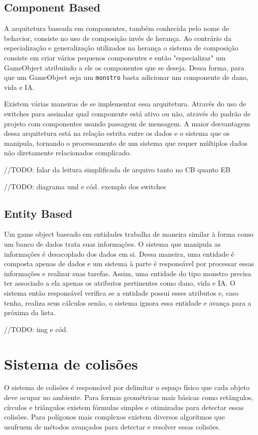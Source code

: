 \documentclass[12pt, 
openright, 
oneside, 
a4paper,    
brazil]{facom-ufu-abntex2}
\begin{document}
\subsection{Component Based}
A arquitetura baseada em componentes, também conhecida pelo nome de behavior, consiste no uso de composição invés de herança. Ao contrário da especialização e generalização utilizados na herança o sistema de composição consiste em criar vários pequenos componentes e então "especializar" um GameObject atribuindo a ele os componentes que se deseja. Dessa forma, para que um GameObject seja um \texttt{monstro} basta adicionar um componente de dano, vida e IA.

Existem várias maneiras de se implementar essa arquitetura. Através do uso de switches para assinalar qual componente está ativo ou não, através do padrão de projeto com componentes usando passagem de mensagem. A maior desvantagem dessa arquitetura está na relação estrita entre os dados e o sistema que os manipula, tornando o processamento de um sistema que requer múltiplos dados não diretamente relacionados complicado.

//TODO: falar da leitura simplificada de arquivo tanto no CB quanto EB

//TODO: diagrama uml e cód. exemplo dos switches


\subsection{Entity Based}
Um game object baseado em entidades trabalha de maneira similar à forma como um banco de dados trata suas informações. O sistema que manipula as informações é desacoplado dos dados em si. Dessa maneira, uma entidade é composta apenas de dados e um sistema à parte é responsável por processar essas informações e realizar suas tarefas.
Assim, uma entidade do tipo monstro precisa ter associado a ela apenas os atributos pertinentes como dano, vida e IA. O sistema então responsável verifica se a entidade possui esses atributos e, caso tenha, realiza seus cálculos senão, o sistema ignora essa entidade e avança para a próxima da lista.

//TODO: img e cód.

\section{Sistema de colisões}

O sistema de colisões é responsável por delimitar o espaço físico que cada objeto deve ocupar no ambiente. Para formas geométricas mais básicas como retângulos, círculos e triângulos existem fórmulas simples e otimizadas para detectar essas colisões. Para polígonos mais complexos existem diversos algoritmos que usufruem de métodos avançados para detectar e resolver essas colisões.
\end{document}
